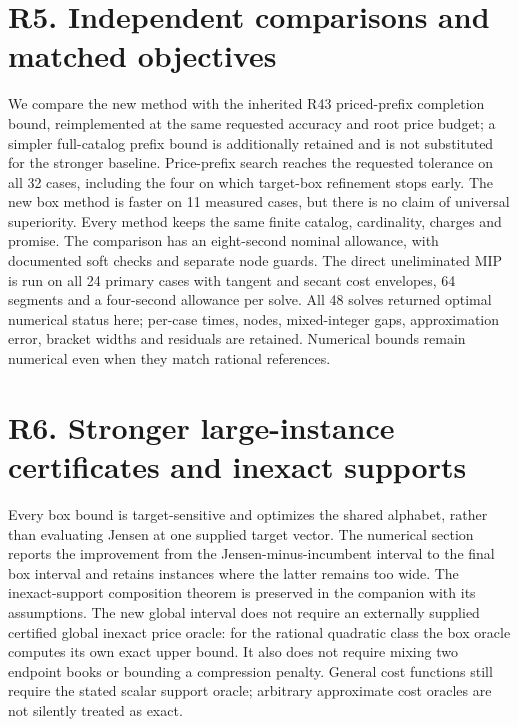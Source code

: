 \documentclass[11pt,letterpaper]{article}
\begin{document}
\section*{R5. Independent comparisons and matched objectives}
We compare the new method with the inherited R43 priced-prefix completion bound, reimplemented at the same requested accuracy and root price budget; a simpler full-catalog prefix bound is additionally retained and is not substituted for the stronger baseline. Price-prefix search reaches the requested tolerance on all 32 cases, including the four on which target-box refinement stops early. The new box method is faster on 11 measured cases, but there is no claim of universal superiority. Every method keeps the same finite catalog, cardinality, charges and promise. The comparison has an eight-second nominal allowance, with documented soft checks and separate node guards. The direct uneliminated MIP is run on all 24 primary cases with tangent and secant cost envelopes, 64 segments and a four-second allowance per solve. All 48 solves returned optimal numerical status here; per-case times, nodes, mixed-integer gaps, approximation error, bracket widths and residuals are retained. Numerical bounds remain numerical even when they match rational references.

\section*{R6. Stronger large-instance certificates and inexact supports}
Every box bound is target-sensitive and optimizes the shared alphabet, rather than evaluating Jensen at one supplied target vector. The numerical section reports the improvement from the Jensen-minus-incumbent interval to the final box interval and retains instances where the latter remains too wide. The inexact-support composition theorem is preserved in the companion with its assumptions. The new global interval does not require an externally supplied certified global inexact price oracle: for the rational quadratic class the box oracle computes its own exact upper bound. It also does not require mixing two endpoint books or bounding a compression penalty. General cost functions still require the stated scalar support oracle; arbitrary approximate cost oracles are not silently treated as exact.
\end{document}
